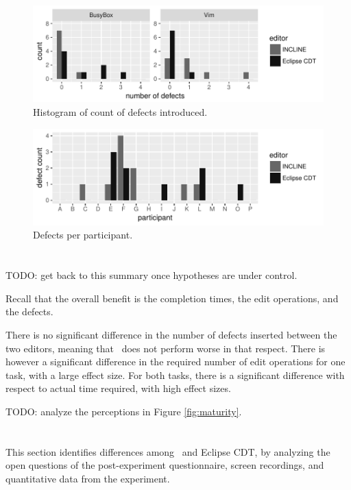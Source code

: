 \begin{figure}
    \centering
    \includegraphics{figure/incl-correct-histo.pdf}
    \caption{Histogram of count of defects introduced.}
    \label{fig:defects-hist}
\end{figure}

\begin{figure}
    \centering
    \includegraphics{figure/incl-par-errors.pdf}
    \caption{Defects per participant.}
    \label{fig:paricipant-errors}
\end{figure}


\section{\RQB}
TODO: get back to this summary once hypotheses are under control.

Recall that the overall benefit is the completion times, the edit operations, and the defects. 

There is no significant difference in the number of defects inserted between the two editors, meaning that \tooln~does not perform worse in that respect. There is however a significant difference in the required number of edit operations for one task, with a large effect size. For both tasks, there is a significant difference with respect to actual time required, with high effect sizes.

TODO: analyze the perceptions in Figure \ref{fig:maturity}.


\section{\RQC}
This section identifies differences among \tooln~and Eclipse CDT, by analyzing the open questions of the post-experiment questionnaire, screen recordings, and quantitative data from the experiment. 

